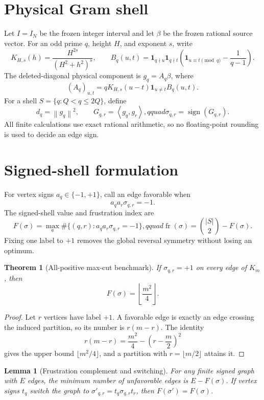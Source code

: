 \documentclass[10pt]{article}
\newtheorem{theorem}{Theorem}
\newtheorem{lemma}{Lemma}
\newcommand{\norm}[1]{\left\lVert #1\right\rVert}
\newcommand{\ip}[2]{\left\langle #1,#2\right\rangle}
\begin{document}
\section{Physical Gram shell}

Let $I=I_N$ be the frozen integer interval and let $\beta$ be the frozen
rational source vector.  For an odd prime $q$, height $H$, and exponent $s$,
write
\[
 K_{H,s}(h)=\frac{H^{2s}}{(H^2+h^2)^s},\qquad
 B_q(u,t)=\mathbf 1_{q\nmid u}\mathbf 1_{q\nmid t}
 \left(\mathbf 1_{u\equiv t\pmod q}-\frac1{q-1}\right).
\]
The deleted-diagonal physical component is $g_q=A_q\beta$, where
\[
 (A_q)_{u,t}=qK_{H,s}(u-t)\mathbf 1_{u\ne t}B_q(u,t).
 \label{eq:model}
\]
For a shell $S=\{q:Q<q\leq 2Q\}$, define
\[
 d_q=\norm{g_q}^2,\qquad G_{q,r}=\ip{g_q}{g_r},qquad
 \sigma_{q,r}=\operatorname{sign}(G_{q,r}).
 \label{eq:gram}
\]
All finite calculations use exact rational arithmetic, so no floating-point
rounding is used to decide an edge sign.

\section{Signed-shell formulation}

For vertex signs $a_q\in\{-1,+1\}$, call an edge favorable when
\[
 a_q a_r\sigma_{q,r}=-1.
\]
The signed-shell value and frustration index are
\[
 F(\sigma)=\max_a\#\{(q,r):a_qa_r\sigma_{q,r}=-1\},qquad
 \operatorname{fr}(\sigma)=\binom{|S|}{2}-F(\sigma).
 \label{eq:objective}
\]
Fixing one label to $+1$ removes the global reversal symmetry without losing
an optimum.

\begin{theorem}[All-positive max-cut benchmark]
If $\sigma_{q,r}=+1$ on every edge of $K_m$, then
\[
 F(\sigma)=\left\lfloor\frac{m^2}{4}\right\rfloor.
\]
\end{theorem}

\begin{proof}
Let $r$ vertices have label $+1$.  A favorable edge is exactly an edge
crossing the induced partition, so its number is $r(m-r)$.  The identity
\[
 r(m-r)=\frac{m^2}{4}-\left(r-\frac m2\right)^2
\]
gives the upper bound $\lfloor m^2/4\rfloor$, and a partition with
$r=\lfloor m/2\rfloor$ attains it.
\end{proof}

\begin{lemma}[Frustration complement and switching]
For any finite signed graph with $E$ edges, the minimum number of
unfavorable edges is $E-F(\sigma)$.  If vertex signs $t_q$ switch the graph
to $\sigma'_{q,r}=t_q\sigma_{q,r}t_r$, then
$F(\sigma')=F(\sigma)$.
\end{lemma}
\end{document}
